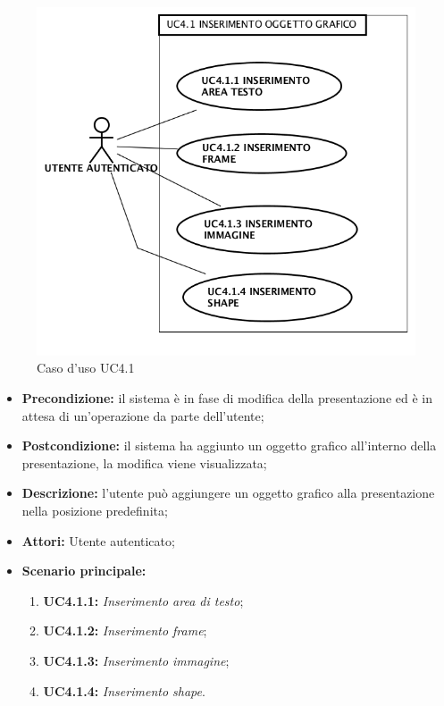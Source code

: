 \begin{figure}[h]
	\begin{center}
	\includegraphics[scale=0.4]{diagram/UC4-1.png}
	\caption{Caso d'uso UC4.1}
	\end{center}
\end{figure}
\begin{itemize}
	\item \textbf{Precondizione:} il sistema è in fase di modifica della presentazione ed è in attesa di un'operazione da parte dell'utente;
	\item \textbf{Postcondizione:} il sistema ha aggiunto un oggetto grafico all'interno della presentazione, la modifica viene visualizzata;
	\item \textbf{Descrizione:} l'utente può aggiungere un oggetto grafico alla presentazione nella posizione predefinita;
	\item \textbf{Attori:} Utente autenticato;
	\item \textbf{Scenario principale:}
	\begin{enumerate}
		\item \textbf{ UC4.1.1:} \textit{ Inserimento area di testo};
		\item \textbf{ UC4.1.2:} \textit{ Inserimento frame};
		\item \textbf{ UC4.1.3:} \textit{ Inserimento immagine};
		\item \textbf{ UC4.1.4:} \textit{ Inserimento shape}.
	\end{enumerate}
\end{itemize}
